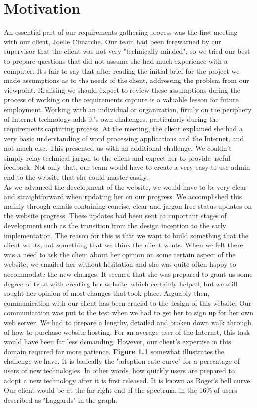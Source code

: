 \documentclass{l3proj}
\begin{document}
\section{Motivation}
An essential part of our requirements gathering process was the first meeting with our client, Joelle Cimatche. Our team had been forewarned by our supervisor that the client was not very "technically minded", so we tried our best to prepare questions that did not assume she had much experience with a computer. It's fair to say that after reading the initial brief for the project we made assumptions as to the needs of the client, addressing the problem from our viewpoint. Realising we should expect to review these assumptions during the process of working on the requirements capture is a valuable lesson for future employment. Working with an individual or organization, firmly on the periphery of Internet technology adds it's own challenges, particularly during the requirements capturing process. At the meeting, the client explained she had a very basic understanding of word processing applications and the Internet, and not much else. This presented us with an additional challenge. We couldn't simply relay technical jargon to the client and expect her to provide useful feedback. Not only that, our team would have to create a very easy-to-use admin end to the website that she could master easily.\\

As we advanced the development of the website, we would have to be very clear and straightforward when updating her on our progress. We accomplished this mainly through emails containing concise, clear and jargon free status updates on the website progress. These updates had been sent at important stages of development such as the transition from the design inception to the early implementation. The reason for this is that we want to build something that the client wants, not something that we think the client wants. When we felt there was a need to ask the client about her opinion on some certain aspect of the website, we emailed her without hesitation and she was quite often happy to accommodate the new changes. It seemed that she was prepared to grant us some degree of trust with creating her website, which certainly helped, but we still sought her opinion of most changes that took place. Arguably then, communication with our client has been crucial to the design of this website. Our communication was put to the test when we had to get her to sign up for her own web server. We had to prepare a lengthy, detailed and broken down walk through of how to purchase website hosting. For an average user of the Internet, this task would have been far less demanding. However, our client's expertise in this domain required far more patience. \textbf{Figure 1.1} somewhat illustrates the challenge we have. It is basically the "adoption rate curve" for a percentage of users of new technologies. In other words, how quickly users are prepared to adopt a new technology after it is first released. It is known as Roger's bell curve. Our client would be at the far right end of the spectrum, in the 16\% of users described as "Laggards" in the graph.\\
	
\end{document}
